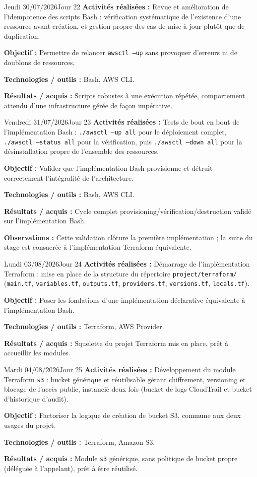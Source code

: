 \documentclass[11pt,a4paper]{article}
\newcommand{\journalfield}[2]{{\color{primaryblue}\textbf{#1 :}} #2\par\smallskip}
\begin{document}
\begin{journalday}{Jeudi 30/07/2026}{Jour 22}
\journalfield{Activités réalisées}{Revue et amélioration de l'idempotence des scripts Bash : vérification systématique de l'existence d'une ressource avant création, et gestion propre des cas de mise à jour plutôt que de duplication.}
\journalfield{Objectif}{Permettre de relancer \texttt{awsctl --up} sans provoquer d'erreurs ni de doublons de ressources.}
\journalfield{Technologies / outils}{Bash, AWS CLI.}
\journalfield{Résultats / acquis}{Scripts robustes à une exécution répétée, comportement attendu d'une infrastructure gérée de façon impérative.}
\end{journalday}

\begin{journalday}{Vendredi 31/07/2026}{Jour 23}
\journalfield{Activités réalisées}{Tests de bout en bout de l'implémentation Bash : \texttt{./awsctl --up all} pour le déploiement complet, \texttt{./awsctl --status all} pour la vérification, puis \texttt{./awsctl --down all} pour la désinstallation propre de l'ensemble des ressources.}
\journalfield{Objectif}{Valider que l'implémentation Bash provisionne et détruit correctement l'intégralité de l'architecture.}
\journalfield{Technologies / outils}{Bash, AWS CLI.}
\journalfield{Résultats / acquis}{Cycle complet provisioning/vérification/destruction validé sur l'implémentation Bash.}
\journalfield{Observations}{Cette validation clôture la première implémentation ; la suite du stage est consacrée à l'implémentation Terraform équivalente.}
\end{journalday}

\begin{journalday}{Lundi 03/08/2026}{Jour 24}
\journalfield{Activités réalisées}{Démarrage de l'implémentation Terraform : mise en place de la structure du répertoire \texttt{project/terraform/} (\texttt{main.tf}, \texttt{variables.tf}, \texttt{outputs.tf}, \texttt{providers.tf}, \texttt{versions.tf}, \texttt{locals.tf}).}
\journalfield{Objectif}{Poser les fondations d'une implémentation déclarative équivalente à l'implémentation Bash.}
\journalfield{Technologies / outils}{Terraform, AWS Provider.}
\journalfield{Résultats / acquis}{Squelette du projet Terraform mis en place, prêt à accueillir les modules.}
\end{journalday}

\begin{journalday}{Mardi 04/08/2026}{Jour 25}
\journalfield{Activités réalisées}{Développement du module Terraform \texttt{s3} : bucket générique et réutilisable gérant chiffrement, versioning et blocage de l'accès public, instancié deux fois (bucket de logs CloudTrail et bucket d'historique d'audit).}
\journalfield{Objectif}{Factoriser la logique de création de bucket S3, commune aux deux usages du projet.}
\journalfield{Technologies / outils}{Terraform, Amazon S3.}
\journalfield{Résultats / acquis}{Module \texttt{s3} générique, sans politique de bucket propre (déléguée à l'appelant), prêt à être réutilisé.}
\end{journalday}
\end{document}
